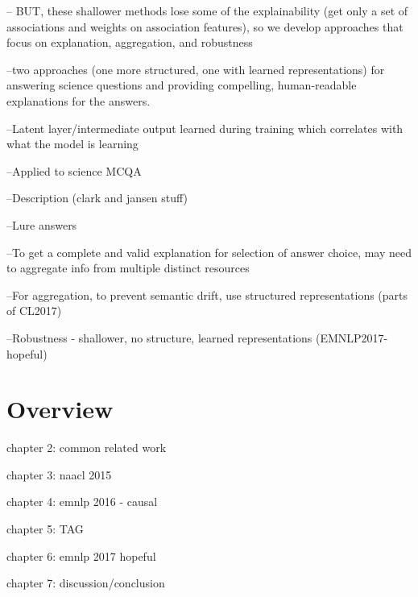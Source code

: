 



-- BUT, these shallower methods lose some of the explainability (get only a set of associations and weights on association features), so we develop approaches that focus on explanation, aggregation, and robustness

--two approaches (one more structured, one with learned representations) for answering science questions and providing compelling, human-readable explanations for the answers.

--Latent layer/intermediate output learned during training which correlates with what the model is learning

--Applied to science MCQA 

--Description (clark and jansen stuff)

--Lure answers

--To get a complete and valid explanation for selection of answer choice, may need to aggregate info from multiple distinct resources

--For aggregation, to prevent semantic drift, use structured representations (parts of CL2017)

--Robustness - shallower, no structure, learned representations (EMNLP2017-hopeful)


\section{Overview\label{sec:overview}}

chapter 2: common related work

chapter 3: naacl 2015

chapter 4: emnlp 2016 - causal

chapter 5: TAG

chapter 6: emnlp 2017 hopeful

chapter 7: discussion/conclusion